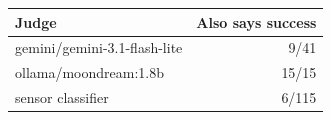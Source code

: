 \begin{tabular}{lr}
\toprule
Judge & Also says success \\
\midrule
gemini/gemini-3.1-flash-lite & 9/41 \\
ollama/moondream:1.8b & 15/15 \\
sensor classifier & 6/115 \\
\bottomrule
\end{tabular}